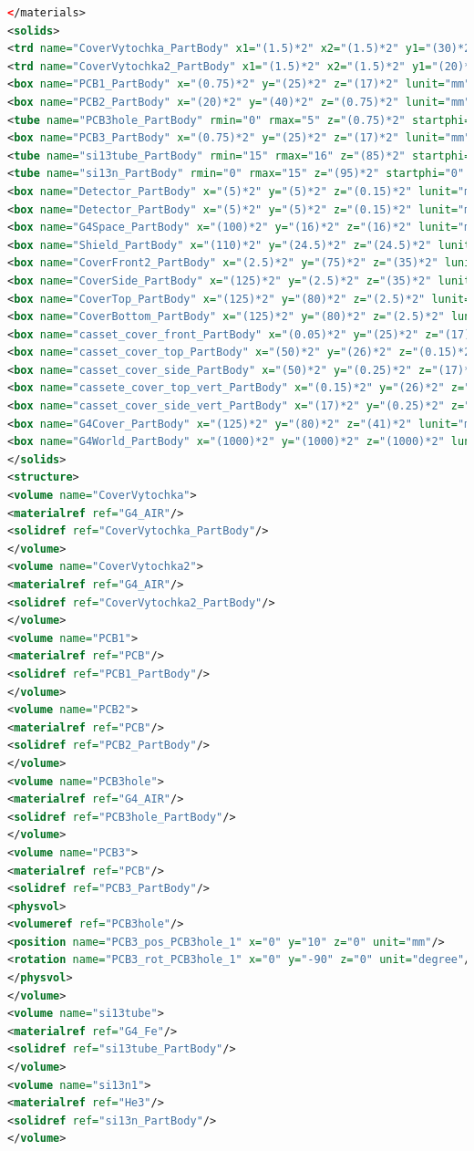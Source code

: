 \begin{lstlisting}[language=XML, firstline=1, lastline=89]
</materials>
<solids>
<trd name="CoverVytochka_PartBody" x1="(1.5)*2" x2="(1.5)*2" y1="(30)*2" y2="(3)*2" z="(13.5)*2" lunit="mm"/>
<trd name="CoverVytochka2_PartBody" x1="(1.5)*2" x2="(1.5)*2" y1="(20)*2" y2="(0.001)*2" z="(10)*2" lunit="mm"/>
<box name="PCB1_PartBody" x="(0.75)*2" y="(25)*2" z="(17)*2" lunit="mm"/>
<box name="PCB2_PartBody" x="(20)*2" y="(40)*2" z="(0.75)*2" lunit="mm"/>
<tube name="PCB3hole_PartBody" rmin="0" rmax="5" z="(0.75)*2" startphi="0" deltaphi="360" lunit="mm" aunit="degree"/>
<box name="PCB3_PartBody" x="(0.75)*2" y="(25)*2" z="(17)*2" lunit="mm"/>
<tube name="si13tube_PartBody" rmin="15" rmax="16" z="(85)*2" startphi="0" deltaphi="360" lunit="mm" aunit="degree"/>
<tube name="si13n_PartBody" rmin="0" rmax="15" z="(95)*2" startphi="0" deltaphi="360" lunit="mm" aunit="degree"/>
<box name="Detector_PartBody" x="(5)*2" y="(5)*2" z="(0.15)*2" lunit="mm"/>
<box name="Detector_PartBody" x="(5)*2" y="(5)*2" z="(0.15)*2" lunit="mm"/>
<box name="G4Space_PartBody" x="(100)*2" y="(16)*2" z="(16)*2" lunit="mm"/>
<box name="Shield_PartBody" x="(110)*2" y="(24.5)*2" z="(24.5)*2" lunit="mm"/>
<box name="CoverFront2_PartBody" x="(2.5)*2" y="(75)*2" z="(35)*2" lunit="mm"/>
<box name="CoverSide_PartBody" x="(125)*2" y="(2.5)*2" z="(35)*2" lunit="mm"/>
<box name="CoverTop_PartBody" x="(125)*2" y="(80)*2" z="(2.5)*2" lunit="mm"/>
<box name="CoverBottom_PartBody" x="(125)*2" y="(80)*2" z="(2.5)*2" lunit="mm"/>
<box name="casset_cover_front_PartBody" x="(0.05)*2" y="(25)*2" z="(17)*2" lunit="mm"/>
<box name="casset_cover_top_PartBody" x="(50)*2" y="(26)*2" z="(0.15)*2" lunit="mm"/>
<box name="casset_cover_side_PartBody" x="(50)*2" y="(0.25)*2" z="(17)*2" lunit="mm"/>
<box name="cassete_cover_top_vert_PartBody" x="(0.15)*2" y="(26)*2" z="(33)*2" lunit="mm"/>
<box name="casset_cover_side_vert_PartBody" x="(17)*2" y="(0.25)*2" z="(33)*2" lunit="mm"/>
<box name="G4Cover_PartBody" x="(125)*2" y="(80)*2" z="(41)*2" lunit="mm"/>
<box name="G4World_PartBody" x="(1000)*2" y="(1000)*2" z="(1000)*2" lunit="mm"/>
</solids>
<structure>
<volume name="CoverVytochka">
<materialref ref="G4_AIR"/>
<solidref ref="CoverVytochka_PartBody"/>
</volume>
<volume name="CoverVytochka2">
<materialref ref="G4_AIR"/>
<solidref ref="CoverVytochka2_PartBody"/>
</volume>
<volume name="PCB1">
<materialref ref="PCB"/>
<solidref ref="PCB1_PartBody"/>
</volume>
<volume name="PCB2">
<materialref ref="PCB"/>
<solidref ref="PCB2_PartBody"/>
</volume>
<volume name="PCB3hole">
<materialref ref="G4_AIR"/>
<solidref ref="PCB3hole_PartBody"/>
</volume>
<volume name="PCB3">
<materialref ref="PCB"/>
<solidref ref="PCB3_PartBody"/>
<physvol>
<volumeref ref="PCB3hole"/>
<position name="PCB3_pos_PCB3hole_1" x="0" y="10" z="0" unit="mm"/>
<rotation name="PCB3_rot_PCB3hole_1" x="0" y="-90" z="0" unit="degree"/>
</physvol>
</volume>
<volume name="si13tube">
<materialref ref="G4_Fe"/>
<solidref ref="si13tube_PartBody"/>
</volume>
<volume name="si13n1">
<materialref ref="He3"/>
<solidref ref="si13n_PartBody"/>
</volume>


\end{lstlisting}

